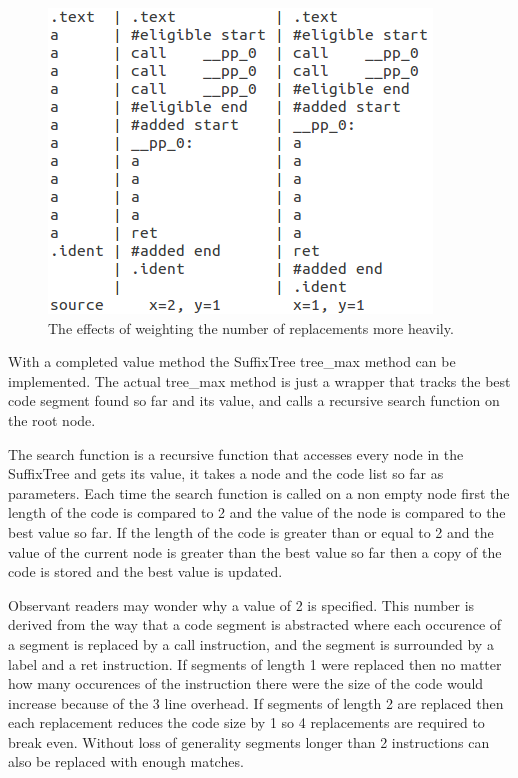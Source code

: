 \documentclass[9pt,nocopyrightspace]{sigplanconf}
\begin{document}
\begin{figure}
\begin{center}
\includegraphics[scale=.8]{weightex}
\caption{The effects of weighting the number of replacements more heavily.}
\end{center}
\end{figure}

With a completed value method the SuffixTree tree\_max method can be implemented.
The actual tree\_max method is just a wrapper that tracks the best code segment found so far and its value, and calls a recursive search function on the root node.

The search function is a recursive function that accesses every node in the SuffixTree and gets its value, it takes a node and the code list so far as parameters.
Each time the search function is called on a non empty node first the length of the code is compared to 2 and the value of the node is compared to the best value so far.
If the length of the code is greater than or equal to 2 and the value of the current node is greater than the best value so far then a copy of the code is stored and the best value is updated.

Observant readers may wonder why a value of 2 is specified.
This number is derived from the way that a code segment is abstracted where each occurence of a segment is replaced by a call instruction, and the segment is surrounded by a label and a ret instruction.
If segments of length 1 were replaced then no matter how many occurences of the instruction there were the size of the code would increase because of the 3 line overhead.
If segments of length 2 are replaced then each replacement reduces the code size by 1 so 4 replacements are required to break even.
Without loss of generality segments longer than 2 instructions can also be replaced with enough matches.
\end{document}

